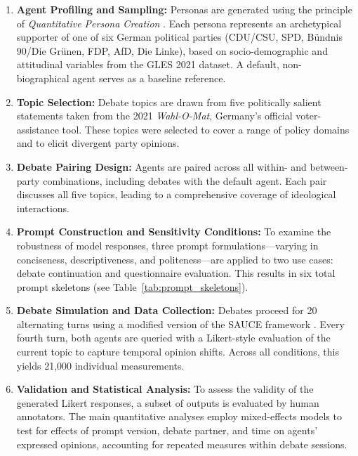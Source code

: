 \begin{enumerate}
    \item \textbf{Agent Profiling and Sampling:}  
    Personas are generated using the principle of \emph{Quantitative Persona Creation} \citep{Salminen2020quantative}. Each persona represents an archetypical supporter of one of six German political parties (CDU/CSU, SPD, Bündnis 90/Die Grünen, FDP, AfD, Die Linke), based on socio-demographic and attitudinal variables from the GLES 2021 dataset. A default, non-biographical agent serves as a baseline reference.

    \item \textbf{Topic Selection:}  
    Debate topics are drawn from five politically salient statements taken from the 2021 \emph{Wahl-O-Mat}, Germany’s official voter-assistance tool. These topics were selected to cover a range of policy domains and to elicit divergent party opinions.

    \item \textbf{Debate Pairing Design:}  
    Agents are paired across all within- and between-party combinations, including debates with the default agent. Each pair discusses all five topics, leading to a comprehensive coverage of ideological interactions.

    \item \textbf{Prompt Construction and Sensitivity Conditions:}  
    To examine the robustness of model responses, three prompt formulations—varying in conciseness, descriptiveness, and politeness—are applied to two use cases: debate continuation and questionnaire evaluation. This results in six total prompt skeletons (see Table~\ref{tab:prompt_skeletons}).

    \item \textbf{Debate Simulation and Data Collection:}  
    Debates proceed for 20 alternating turns using a modified version of the SAUCE framework \citep{neuberger2024sauce}. Every fourth turn, both agents are queried with a Likert-style evaluation of the current topic to capture temporal opinion shifts. Across all conditions, this yields 21,000 individual measurements.

    \item \textbf{Validation and Statistical Analysis:}  
    To assess the validity of the generated Likert responses, a subset of outputs is evaluated by human annotators. The main quantitative analyses employ mixed-effects models to test for effects of prompt version, debate partner, and time on agents’ expressed opinions, accounting for repeated measures within debate sessions.
\end{enumerate}

